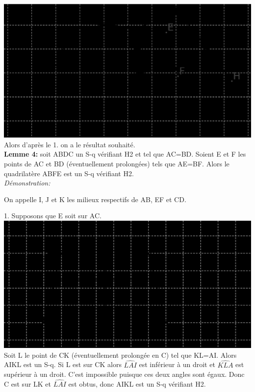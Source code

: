 \documentclass[a4paper, 12pt, twoside]{book}
\begin{document}
\includegraphics[scale=0.5]{figures/sacc170ter.eps}\\

Alors d'après le 1. on a le résultat souhaité.\\
 
 


 
 
 

\textbf{Lemme 4:} soit ABDC un S-q vérifiant H2 et tel que AC=BD. Soient E et F les points de AC et BD (éventuellement prolongées) tels que AE=BF.  Alors le quadrilatère ABFE est un S-q vérifiant H2.\\

\textit{Démonstration:}\

On appelle I, J et K les milieux respectifs de AB, EF et CD.\

1. Supposons que E soit sur AC.\\

 \includegraphics[scale=0.7]{figures/sacc231.eps}\\

 
 Soit L le point de CK (éventuellement prolongée en C) tel que KL=AI. Alors AIKL est un S-q. Si L est sur CK alors $\hat{LAI}$ est inférieur à un droit et $\hat{KLA}$ est supérieur à un droit. C'est impossible puisque ces deux angles sont égaux. Donc C est sur LK et $\hat{LAI}$ est obtus, donc AIKL est un S-q vérifiant H2.\
 
\end{document}
